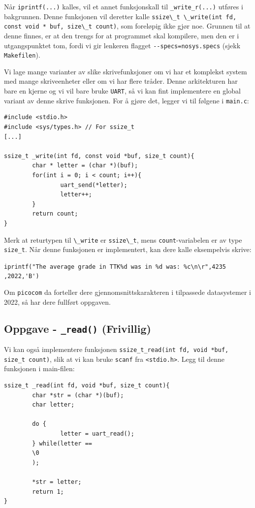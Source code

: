 Når \verb|iprintf(...)| kalles, vil et annet funksjonskall til \verb|_write_r(...)| utføres i bakgrunnen. Denne funksjonen vil deretter kalle \lstinline{ssize\_t \_write(int fd, const void * buf, size\_t count)}, som foreløpig ikke gjør noe. Grunnen til at denne finnes, er at den trengs for at programmet skal kompilere, men den er i utgangspunktet tom, fordi vi gir lenkeren flagget \verb|--specs=nosys.specs| (sjekk \verb|Makefilen|).

Vi lage mange varianter av slike skrivefunksjoner om vi har et komplekst system med mange skriveenheter eller om vi har flere tråder. Denne arkitekturen har bare en kjerne og vi vil bare bruke \verb|UART|, så vi kan fint implementere en global variant av denne skrive funksjonen. For å gjøre det, legger vi til følgene i \verb|main.c|:


\begin{lstlisting}
#include <stdio.h>
#include <sys/types.h> // For ssize_t
[...]

ssize_t _write(int fd, const void *buf, size_t count){
        char * letter = (char *)(buf);
        for(int i = 0; i < count; i++){
                uart_send(*letter);
                letter++;
        }
        return count;
}
\end{lstlisting}

Merk at returtypen til \lstinline{\_write} er \lstinline{ssize\_t}, mens \verb|count|-variabelen er av type \verb|size_t|. Når denne funksjonen er implementert, kan dere kalle eksempelvis skrive:




\verb|iprintf("The average grade in TTK%d was in %d was: %c\n\r",4235|\newline
\verb|,2022,'B')|

Om \verb|picocom| da forteller dere gjennomsnittskarakteren i tilpassede datasystemer i 2022, så har dere fullført oppgaven.




\cprotect\subsection{Oppgave - \lstinline{_read()} (Frivillig)}

Vi kan også implementere funksjonen \lstinline{ssize_t_read(int fd, void *buf, size_t count)}, slik at vi kan bruke \verb|scanf| fra \verb|<stdio.h>|. Legg til denne funksjonen i main-filen:


\begin{lstlisting}
ssize_t _read(int fd, void *buf, size_t count){
        char *str = (char *)(buf);
        char letter;
        
        do {
                letter = uart_read();
        } while(letter == 
        \0
        );
        
        *str = letter;
        return 1;
}
\end{lstlisting}

